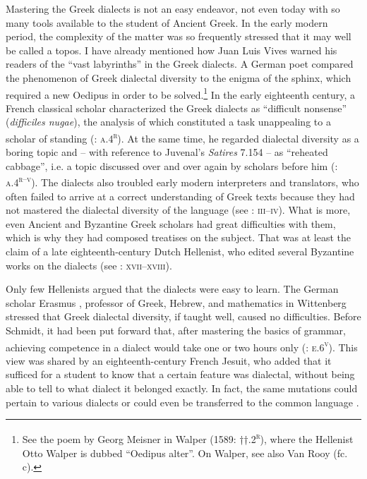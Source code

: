 Mastering the Greek dialects is not an easy endeavor, not even today with so many tools available to the student of Ancient Greek. In the early modern period, the complexity of the matter was so frequently stressed that it may well be called a topos. I have already mentioned how Juan Luis Vives warned his readers of the “vast labyrinths” in the Greek dialects. A German poet compared the phenomenon of Greek dialectal diversity to the enigma of the sphinx, which required a new Oedipus in order to be solved.\footnote{See the poem by Georg Meisner in Walper (1589: ††.2\textsc{\textsuperscript{r}}), where the Hellenist Otto Walper is dubbed “Oedipus alter”. On Walper, see also Van Rooy (fc. c).} In the early eighteenth century, a French classical scholar characterized the Greek dialects as “difficult nonsense” (\textit{difficiles nugae}), the analysis of which constituted a task unappealing to a scholar of standing (\citealt{Maittaire1706}: \textsc{a.4}\textsc{\textsuperscript{r}}). At the same time, he regarded dialectal diversity as a boring topic and – with reference to Juvenal’s \textit{Satires} 7.154 – as “reheated cabbage”, i.e. a topic discussed over and over again by scholars before him (\citealt{Maittaire1706}: \textsc{a.4}\textsc{\textsuperscript{r–v}}). The dialects also troubled early modern interpreters and translators, who often failed to arrive at a correct understanding of Greek texts because they had not mastered the dialectal diversity of the language (see \citealt{Facius1782}: \textsc{iii–iv}). What is more, even Ancient and Byzantine Greek scholars had great difficulties with them, which is why they had composed treatises on the subject. That was at least the claim of a late eighteenth-century Dutch Hellenist, who edited several Byzantine works on the dialects (see \citealt{Koen1766}: \textsc{xvii–xviii}).

Only few Hellenists argued that the dialects were easy to learn. The German scholar Erasmus \citet[):(.2\textsc{\textsuperscript{r}}]{Schmidt1604}, professor of Greek, Hebrew, and mathematics in Wittenberg stressed that Greek dialectal diversity, if taught well, caused no difficulties. Before Schmidt, it had been put forward that, after mastering the basics of grammar, achieving competence in a dialect would take one or two hours only (\citealt{Caselius1560}: \textsc{e.6}\textsc{\textsuperscript{v}}). This view was shared by an eighteenth-century French Jesuit, who added that it sufficed for a student to know that a certain feature was dialectal, without being able to tell to what dialect it belonged exactly. In fact, the same mutations could pertain to various dialects or could even be transferred to the common language \citep[101]{Giraudeau1739}.

